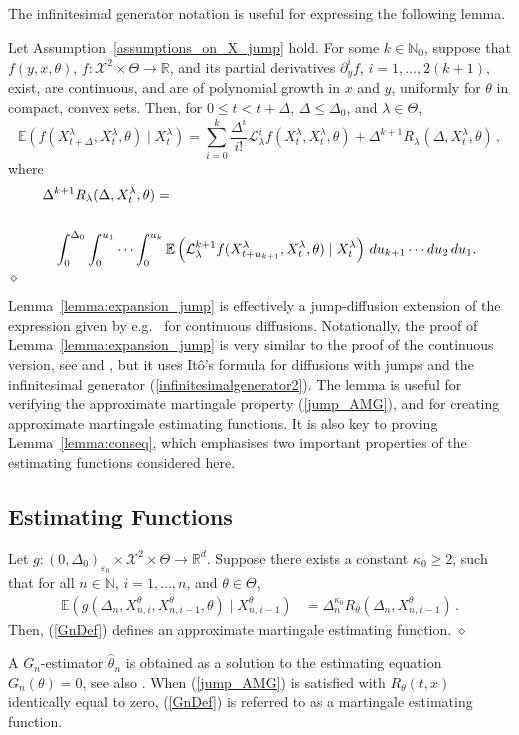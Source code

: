 \documentclass[11pt,a4paper]{article}
\newcommand{\EE}{{\mathbb E}}
\newcommand{\RR}{{\mathbb R}}
\newcommand{\NN}{{\mathbb N}}
\renewcommand{\ll}{{\mathcal{L}}}
\newcommand{\xx}{{\mathcal{X}}}
\newcommand{\dqed}{{\leavevmode \unskip \penalty9999 \hbox{} \nobreak \hfill \quad \hbox{$\diamond$}}}
\numberwithin{equation}{section}
\numberwithin{theorem}{section}
\begin{document}
The infinitesimal generator notation is useful for expressing the
following lemma.
%
\begin{lemma}
Let Assumption~\ref{assumptions_on_X_jump} hold. For some $k\in \NN_0$, suppose that $f(y,x,\theta)$, $f: \xx^2\times \Theta \to \RR$, and its partial derivatives $\partial^i_y f$, $i=1,\ldots,2(k+1)$, exist, are continuous, and are of polynomial growth in $x$ and $y$, uniformly for $\theta$ in compact, convex sets. Then, for $0\leq t < t+ \Delta$, $\Delta\leq \Delta_0$,  and $\lambda \in \Theta$, 
\[ 
\EE\left ( f(X^\lambda_{t+\Delta}, X^\lambda_t, \theta) \mid X_t^\lambda\right) = \sum_{i=0}^k \frac{\Delta^i}{i!} \ll_\lambda^i f(X_t^\lambda, X_t^\lambda, \theta) + \Delta^{k+1} R_\lambda(\Delta,X^\lambda_t, \theta)\,, 
\]
where
\begin{eqnarray*}
\lefteqn{\Delta^{k+1} R_\lambda(\Delta,X^\lambda_t, \theta) =} \\ && \\ &&\int_0^{\Delta_0} \int_0^{u_1} \cdots \int_0^{u_k} \EE\left( \ll_\lambda ^{k+1} f(X^\lambda_{t+u_{k+1}},X_t^\lambda, \theta)\mid X^\lambda_t \right)\, du_{k+1}\cdots du_2\,du_1.
\end{eqnarray*}
\dqed
\label{lemma:expansion_jump}
\end{lemma} 
%
Lemma~\ref{lemma:expansion_jump} is effectively a jump-diffusion extension of the expression given by e.g.\ \cite[Lemma 1]{florenszmirou1989} for continuous diffusions. Notationally, the proof of Lemma~\ref{lemma:expansion_jump} is very similar to the proof of the continuous version, see \cite[Lemma 1.10]{soerensen2012} and \cite[Lemma 1]{kessler1997}, but it uses It\^{o}'s formula for diffusions with jumps and the infinitesimal generator (\ref{infinitesimalgenerator2}). The lemma is useful for verifying the approximate martingale property (\ref{jump_AMG}), and for creating approximate martingale estimating functions. It is also key to proving Lemma~\ref{lemma:conseq}, which emphasises two important properties of the estimating functions considered here.

\subsection{Estimating Functions}
\begin{definition}
Let $g: (0,\Delta_0)_{\varepsilon_0} \times \xx^2 \times \Theta \to \RR^d$. Suppose there exists a constant ${\kappa_0} \geq 2$, such that for all $n\in \NN$, $i=1,\ldots,n$, and $\theta \in \Theta$, 
\begin{align}
\EE\left( g(\Delta_n,X^\theta_{n,i},X^\theta_{n,i-1}, \theta) \mid   X^\theta_{n,i-1}\right) &= \Delta_n^{\kappa_0} R_\theta(\Delta_n, X^\theta_{n,i-1})\,.
\label{jump_AMG}
\end{align}
Then, (\ref{GnDef}) defines an approximate martingale estimating function. \dqed
\label{def:AMEF_jump} 
\end{definition}
%
A $G_n$-estimator $\hat{\theta}_n$ is obtained as a solution to the estimating equation $G_n(\theta) = 0$, see also \cite[Definition 2.3]{jakobsen2017}. When (\ref{jump_AMG}) is satisfied with $R_\theta(t,x)$ identically equal to zero, (\ref{GnDef}) is referred to as a martingale estimating function. \medskip
\end{document}
